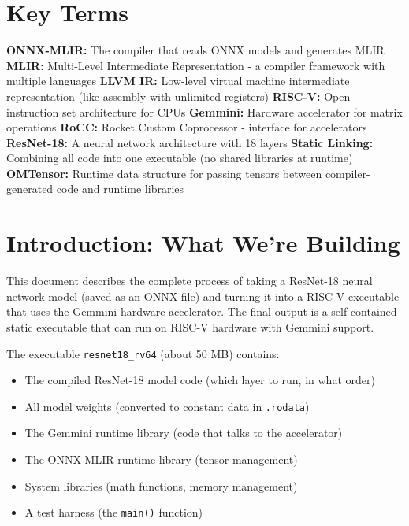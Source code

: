 \documentclass[12pt,a4paper]{article}
\begin{document}
\section*{Key Terms}

\noindent
\textbf{ONNX-MLIR:} The compiler that reads ONNX models and generates MLIR
\textbf{MLIR:} Multi-Level Intermediate Representation - a compiler framework with multiple languages
\textbf{LLVM IR:} Low-level virtual machine intermediate representation (like assembly with unlimited registers)
\textbf{RISC-V:} Open instruction set architecture for CPUs
\textbf{Gemmini:} Hardware accelerator for matrix operations
\textbf{RoCC:} Rocket Custom Coprocessor - interface for accelerators
\textbf{ResNet-18:} A neural network architecture with 18 layers
\textbf{Static Linking:} Combining all code into one executable (no shared libraries at runtime)
\textbf{OMTensor:} Runtime data structure for passing tensors between compiler-generated code and runtime libraries

\vspace{0.8em}

\tableofcontents
\newpage

\section{Introduction: What We're Building}

This document describes the complete process of taking a ResNet-18 neural network model (saved as an ONNX file) and turning it into a RISC-V executable that uses the Gemmini hardware accelerator. The final output is a self-contained static executable that can run on RISC-V hardware with Gemmini support.

\begin{examplebox}
The executable \texttt{resnet18\_rv64} (about 50 MB) contains:
\begin{itemize}
  \item The compiled ResNet-18 model code (which layer to run, in what order)
  \item All model weights (converted to constant data in \texttt{.rodata})
  \item The Gemmini runtime library (code that talks to the accelerator)
  \item The ONNX-MLIR runtime library (tensor management)
  \item System libraries (math functions, memory management)
  \item A test harness (the \texttt{main()} function)
\end{itemize}
\end{examplebox}
\end{document}
